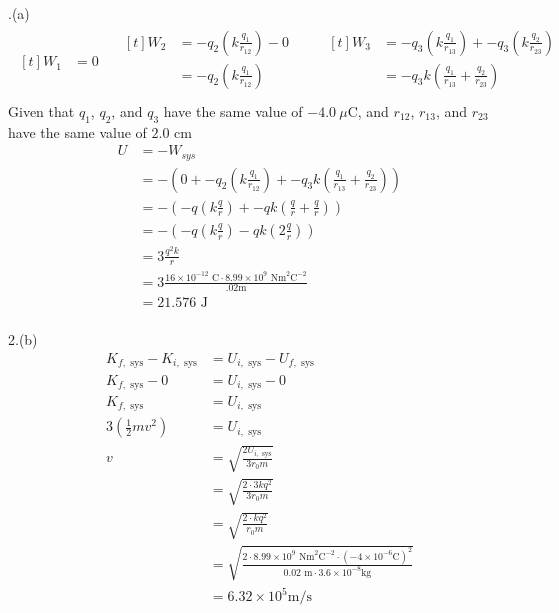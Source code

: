 \documentclass[11pt]{article}
\begin{document}
.(a)
\begin{align*}
\begin{aligned}[t]
W_1 &= 0
\end{aligned}
\quad
\begin{aligned}[t]
W_2 &= -q_2 (k \frac{q_1}{r_{12}}) - 0 \\
    &= -q_2 (k \frac{q_1}{r_{12}}) \\
\end{aligned}
\qquad
\begin{aligned}[t]
W_3 &= -q_3 (k \frac{q_1}{r_{13}}) + -q_3 (k \frac{q_2}{r_{23}}) \\
    &= -q_3 k (\frac{q_1}{r_{13}} + \frac{q_2}{r_{23}}) \\
\end{aligned}
\end{align*}
Given that \(q_1\), \(q_2\), and \(q_3\) have the same value of \(-4.0 \ \mu \text{C}\), and \(r_{12}\), \(r_{13}\), and \(r_{23}\) have the same value of \(2.0 \text{ cm}\)
\begin{align*}
U &= -W_{sys} \\
  &= - ( 0 + - q_2 (k \frac{q_1}{r_{12}}) + - q_3 k (\frac{q_1}{r_{13}} + \frac{q_2}{r_{23}}) ) \\
  &= - ( - q (k \frac{q}{r}) + - q k (\frac{q}{r} + \frac{q}{r}) ) \\
  &= - ( - q (k \frac{q}{r}) - q k (2\frac{q}{r}) ) \\
  &= 3 \frac{q^2 k}{r} \\
  &= 3 \frac{16 \times 10^{-12} \text{ C} \cdot 8.99 \times 10^9 \text{ Nm}^2 \text{C}^{-2}}{.02 \text{m}} \\
  &= 21.576 \text{ J} \\
\end{align*}

2.(b)
\begin{align*}
K_{f, \text{ sys}} - K_{i, \text{ sys}} &= U_{i, \text{ sys}} - U_{f, \text{ sys}} \\
K_{f, \text{ sys}} - 0 &= U_{i, \text{ sys}} - 0 \\
K_{f, \text{ sys}} &= U_{i, \text{ sys}} \\
3(\frac{1}{2} mv^2) &= U_{i, \text{ sys}} \\
v &= \sqrt{ \frac{2U_{i, \text{ sys}}}{3r_0 m}} \\
  &= \sqrt{ \frac{2 \cdot 3kq^2}{3r_0 m}} \\\
  &= \sqrt{ \frac{2 \cdot kq^2}{r_0 m}} \\
  &= \sqrt{ \frac{2 \cdot 8.99 \times 10^9 \text{ Nm}^2 \text{C}^{-2} \cdot (-4 \times 10^{-6} \text{C})^2}{0.02 \text{ m} \cdot 3.6 \times 10^{-8} \text{kg}}} \\
  &= 6.32 \times 10^5 \text{m} / \text{s}
\end{align*}
\end{document}
